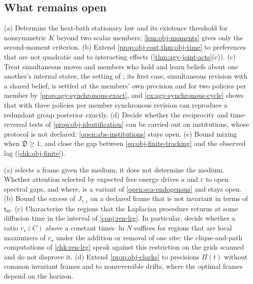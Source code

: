 \subsection{What remains open}\label{sec:obj-open}

\begin{openproblem}\label{open:obj-strategic}
(a) Determine the heat-bath stationary law and its existence threshold for nonsymmetric $K$ beyond two scalar members; \cref{lem:obj-moments} gives only the second-moment criterion. (b) Extend \cref{prop:obj-cost,thm:obj-time} to preferences that are not quadratic and to interacting effects (\cref{thm:agy-joint-acts}(c)). (c) Treat simultaneous moves and members who hold and learn beliefs about one another's internal states, the setting of \citet{ruizserra2025factorised}; its first case, simultaneous revision with a shared belief, is settled at the members' own precision and for two policies per member by \cref{prop:agy-synchronous-exact}, and \cref{ex:agy-synchronous-cycle} shows that with three policies per member synchronous revision can reproduce a redundant group posterior exactly. (d) Decide whether the reciprocity and time-reversal tests of \cref{prop:obj-identification} can be carried out on institutions, whose protocol is not declared; \cref{open:abs-institutions} stays open. (e) Bound mixing when $\mathfrak D\ge1$, and close the gap between \eqref{eq:obj-finite-tracking} and the observed lag (\cref{chk:obj-finite}).
\end{openproblem}

\begin{openproblem}\label{open:obj-scale}
(a)  selects a frame given the medium; it does not determine the medium. Whether attention selected by expected free energy drives $a$ and $\varepsilon$ to open spectral gaps, and where, is a variant of \cref{open:sca-endogenous} and stays open. (b) Bound the excess of $J_{\tau,c}$ on a declared frame that is not invariant in terms of $\mathsf t_\Theta$. (c) Characterize the regions that the Laplacian procedure returns at some diffusion time in the interval of \cref{conj:ren-lrg}. In particular, decide whether a ratio $r_\star(C)$ above a constant times $\ln N$ suffices for regions that are local maximizers of $r_\star$ under the addition or removal of one site; the clique-and-path computations of \cref{chk:ren-lrg} speak against this restriction on the grids scanned and do not disprove it. (d) Extend \cref{prop:obj-clocks} to precisions $\Pi(t)$ without common invariant frames and to nonreversible drifts, where the optimal frames depend on the horizon.
\end{openproblem}
